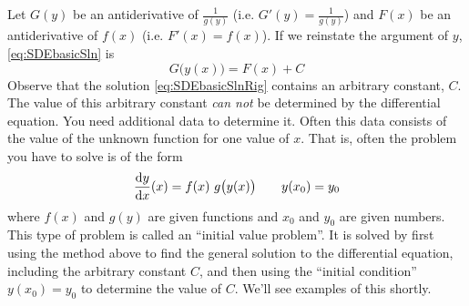 Let $G(y)$ be an antiderivative of $\frac{1}{g(y)}$
(i.e. $G'(y)=\frac{1}{g(y)}$) and $F(x)$ be an antiderivative of $f(x)$
(i.e. $F'(x)=f(x)$). If we reinstate the argument of $y$, 
\eqref{eq:SDEbasicSln} is
\begin{equation}\label{eq:SDEbasicSlnRig}
G\big(y(x)\big) = F(x) + C
\end{equation}
Observe that the solution \eqref{eq:SDEbasicSlnRig} contains an arbitrary
constant, $C$. The value of this arbitrary constant \emph{can not}
be determined by the differential equation. You need additional data
to determine it. Often this data consists of the value of the unknown
function for one value of $x$. That is, often the problem you have to solve
is of the form
\begin{equation*}
\diff{y}{x}(x) = f(x)\ g\big(y(x)\big)\qquad y(x_0)=y_0
\end{equation*}
where $f(x)$ and $g(y)$ are given functions and $x_0$ and $y_0$ are
given numbers. This type of problem is called an ``initial value problem''.
It is solved by first using the method above to find the general solution
to the differential equation, including the arbitrary constant $C$,
and then using the ``initial condition'' $y(x_0)=y_0$ to determine the
value of $C$. We'll see examples of this shortly.

